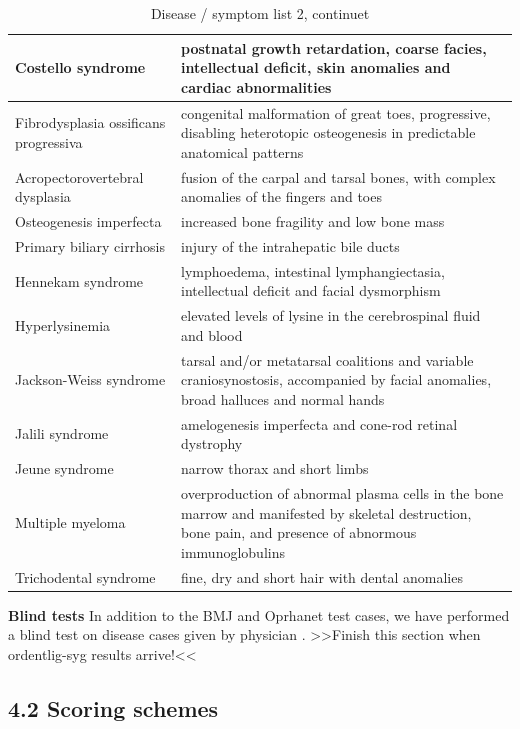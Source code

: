 \begin{table}[h]
\caption{Disease / symptom list 2, continuet}
\begin{tabular}{| p{5.5cm} | p{5.5cm}|}
\hline
Costello syndrome & postnatal growth retardation, coarse facies, intellectual deficit, skin anomalies and cardiac abnormalities \\
\hline
Fibrodysplasia ossificans progressiva & congenital malformation of great toes, progressive, disabling heterotopic osteogenesis in predictable anatomical patterns \\
\hline
Acropectorovertebral dysplasia & fusion of the carpal and tarsal bones, with complex anomalies of the fingers and toes \\
\hline
Osteogenesis imperfecta & increased bone fragility and low bone mass \\
\hline
Primary biliary cirrhosis & injury of the intrahepatic bile ducts \\
\hline
Hennekam syndrome & lymphoedema, intestinal lymphangiectasia, intellectual deficit and facial dysmorphism \\
\hline
Hyperlysinemia & elevated levels of lysine in the cerebrospinal fluid and blood \\
\hline
Jackson-Weiss syndrome & tarsal and/or metatarsal coalitions and variable craniosynostosis, accompanied by facial anomalies, broad halluces and normal hands \\
\hline
Jalili syndrome & amelogenesis imperfecta and cone-rod retinal dystrophy \\
\hline
Jeune syndrome & narrow thorax and short limbs \\
\hline
Multiple myeloma & overproduction of abnormal plasma cells in the bone marrow and manifested by skeletal destruction, bone pain, and presence of abnormous immunoglobulins \\
\hline
Trichodental syndrome & fine, dry and short hair with dental anomalies \\
\hline
\end{tabular}
\end{table}

\textbf{Blind tests}
In addition to the BMJ and Oprhanet test cases, we have performed a blind test on disease cases given by physician \cite{TheDude}.
>>Finish this section when ordentlig-syg results arrive!<<

\subsection{4.2 Scoring schemes}

